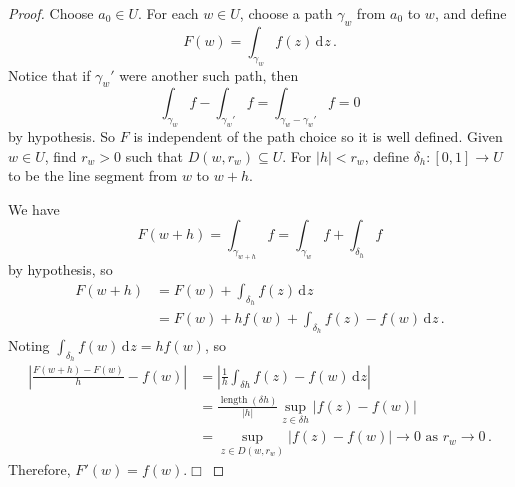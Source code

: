 \documentclass{article}
\theoremstyle{plain}\theoremheaderfont{\normalfont\itshape}\theorembodyfont{\rmfamily}\theoremseparator{.}\newtheorem*{rem}{Remark}\newtheorem*{ex}{Example}\newtheorem*{proof}{Proof}\newtheorem*{altp}{Alternative proof}\newtheorem*{con}{Consequences}\newtheorem*{notn}{Notations}\newtheorem*{cau}{Caution}\newtheorem*{term}{Terminology}\newtheorem*{keyex}{Key example}
\theoremstyle{plain}\theoremheaderfont{\normalfont\bfseries}\theorembodyfont{\rmfamily}\theoremseparator{.}\newtheorem{thm}{Theorem}[section]\newtheorem{lem}[thm]{Lemma}\newtheorem{prop}[thm]{Proposition}\newtheorem*{cor}{Corollary}\newtheorem{defn}[thm]{Definition}\newtheorem{clm}[thm]{Claim}\newtheorem{clminproof}{Claim}\newtheorem{leminproof}{Lemma}\newtheorem{app}{Application}
\theoremstyle{break}\theoremheaderfont{\normalfont\itshape}\theorembodyfont{\rmfamily}\theoremseparator{.\medskip}\newtheorem*{proofskip}{Proof}\newtheorem*{exs}{Examples}\newtheorem*{rems}{Remarks}\newtheorem*{rec}{Recall}\newtheorem*{ppts}{Properties}
\theoremstyle{break}\theoremheaderfont{\normalfont\bfseries}\theorembodyfont{\rmfamily}\theoremseparator{.\medskip}\newtheorem{lemskip}[thm]{Lemma}\newtheorem{defnskip}[thm]{Definition}\newtheorem{propskip}[thm]{Proposition}\newtheorem{thmskip}[thm]{Theorem}
\numberwithin{equation}{section}
\DeclareMathOperator*{\length}{length}
\newcommand{\qed}{\hfill\ensuremath{\Box}}
\newcommand{\abs}[1]{\left|#1\right|}
\newcommand{\dd}[2][]{\,\mathrm{d}^{#1} #2}
\begin{document}
    \begin{proof}
        Choose \(a_0\in U\). For each \(w\in U\), choose a path \(\gamma_w\) from \(a_0\) to \(w\), and define
        \[ F(w)=\int_{\gamma_w}f(z)\dd{z}\,.\]
        Notice that if \(\gamma_w'\) were another such path, then
        \[\int_{\gamma_w}f-\int_{\gamma_w'}f=\int_{\gamma_w-\gamma_w'}f=0\]
        by hypothesis. So \(F\) is independent of the path choice so it is well defined. Given \(w\in U\), find \(r_w>0\) such that \(D(w,r_w)\subseteq U\). For \(\abs{h}<r_w\), define \(\delta_h:[0,1]\to U\) to be the line segment from \(w\) to \(w+h\).
        \begin{center}
            \centering
        \end{center}

        We have
        \[F(w+h)=\int_{\gamma_{w+h}}f=\int_{\gamma_w}f+\int_{\delta_h}f\]
        by hypothesis, so
        \begin{align*}
            F(w+h)&=F(w)+\int_{\delta_h}f(z)\dd{z}\\
            &=F(w)+hf(w)+\int_{\delta_h}f(z)-f(w)\dd{z}\,.
        \end{align*}
        Noting \(\int_{\delta_h}f(w)\dd{z}=hf(w)\), so
        \begin{align*}
            \abs{\frac{F(w+h)-F(w)}{h}-f(w)}&=\abs{\frac{1}{h}\int_{\delta h}f(z)-f(w)\dd{z}}\\
            &=\frac{\length(\delta h)}{\abs{h}}\sup_{z\in\delta h}\abs{f(z)-f(w)}\\
            &=\sup_{z\in D(w,r_w)}\abs{f(z)-f(w)}\to 0\text{ as }r_w\to 0\,.
        \end{align*}
        Therefore, \(F'(w)=f(w)\).\qed
    \end{proof}
\end{document}
